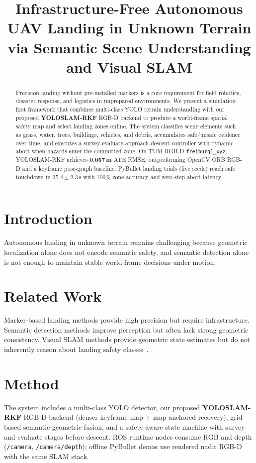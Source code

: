 \documentclass[conference]{IEEEtran}
\begin{document}
\title{Infrastructure-Free Autonomous UAV Landing in Unknown Terrain via Semantic Scene Understanding and Visual SLAM}
\author{}
\maketitle

\begin{abstract}
Precision landing without pre-installed markers is a core requirement for field robotics, disaster response, and logistics in unprepared environments. We present a simulation-first framework that combines multi-class YOLO terrain understanding with our proposed \textbf{YOLOSLAM-RKF} RGB-D backend to produce a world-frame spatial safety map and select landing zones online. The system classifies scene elements such as grass, water, trees, buildings, vehicles, and debris, accumulates safe/unsafe evidence over time, and executes a survey-evaluate-approach-descent controller with dynamic abort when hazards enter the committed zone. On TUM RGB-D \texttt{freiburg1\_xyz}, YOLOSLAM-RKF achieves \textbf{0.057\,m} ATE RMSE, outperforming OpenCV ORB RGB-D and a keyframe pose-graph baseline. PyBullet landing trials (five seeds) reach safe touchdown in $35.4 \pm 2.3$\,s with 100\% zone accuracy and zero-step abort latency.
\end{abstract}

\section{Introduction}
Autonomous landing in unknown terrain remains challenging because geometric localization alone does not encode semantic safety, and semantic detection alone is not enough to maintain stable world-frame decisions under motion.

\section{Related Work}
Marker-based landing methods provide high precision but require infrastructure. Semantic detection methods improve perception but often lack strong geometric consistency. Visual SLAM methods provide geometric state estimates but do not inherently reason about landing safety classes~\cite{orbslam32021,droid2021,labbe2016rtabmap}.

\section{Method}
The system includes a multi-class YOLO detector, our proposed \textbf{YOLOSLAM-RKF} RGB-D backend (denser keyframe map + map-anchored recovery), grid-based semantic-geometric fusion, and a safety-aware state machine with survey and evaluate stages before descent. ROS runtime nodes consume RGB and depth (\texttt{/camera}, \texttt{/camera/depth}); offline PyBullet demos use rendered nadir RGB-D with the same SLAM stack.
\end{document}

